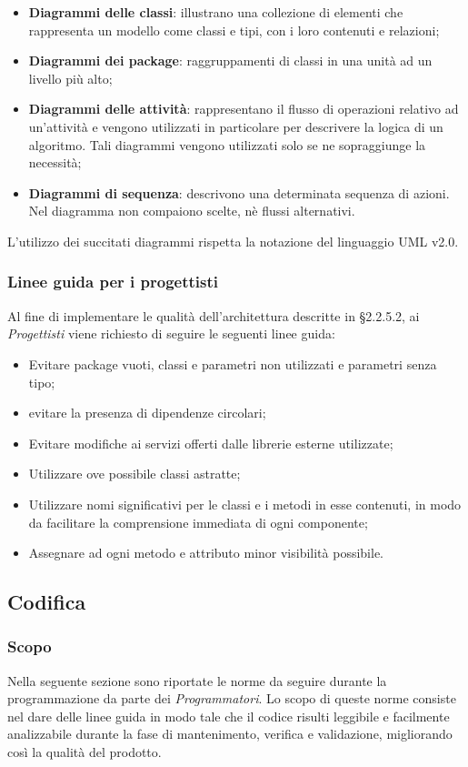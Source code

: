 \documentclass[../NomeDocumento.tex]{subfiles}
\begin{document}
	\begin{itemize}
		\item \textbf{Diagrammi delle classi}: illustrano una collezione di elementi che rappresenta un modello come classi e tipi, con i loro contenuti e relazioni;
		\item \textbf{Diagrammi dei package}: raggruppamenti di classi in una unità ad un livello più alto;
		\item \textbf{Diagrammi delle attività}: rappresentano il flusso di operazioni relativo ad
		un’attività e vengono utilizzati in particolare per descrivere la logica di un algoritmo. Tali diagrammi vengono utilizzati solo se ne sopraggiunge la necessità;
		\item \textbf{Diagrammi di sequenza}: descrivono una determinata sequenza di azioni. Nel diagramma non compaiono scelte, nè flussi
		alternativi.
	\end{itemize}

	\noindent L’utilizzo dei succitati diagrammi rispetta la notazione del linguaggio UML v2.0.
	
	\subsubsection{Linee guida per i progettisti}
	Al fine di implementare le qualità dell’architettura descritte in §2.2.5.2, ai \textit{Progettisti} viene
	richiesto di seguire le seguenti linee guida:
	\begin{itemize}
		\item Evitare package vuoti, classi e parametri non utilizzati e parametri senza tipo;
		\item evitare la presenza di dipendenze circolari;
		\item Evitare modifiche ai servizi offerti dalle librerie esterne utilizzate;
		\item Utilizzare ove possibile classi astratte;
		\item Utilizzare nomi significativi per le classi e i metodi in esse contenuti, in modo da
		facilitare la comprensione immediata di ogni componente;
		\item Assegnare ad ogni metodo e attributo minor visibilità possibile.
	\end{itemize}
	
	\subsection{Codifica}
	
	\subsubsection{Scopo}
	Nella seguente sezione sono riportate le norme da seguire durante la programmazione da parte dei \textit{Programmatori}. Lo scopo di queste norme consiste nel dare delle linee guida in modo tale che il codice risulti leggibile e facilmente analizzabile durante la fase di mantenimento, verifica e validazione, migliorando così la qualità del prodotto.
\end{document}
